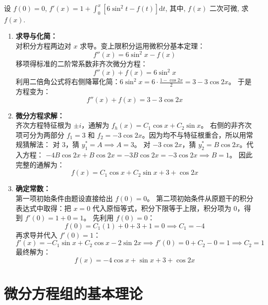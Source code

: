 \documentclass[lang=cn,11pt]{elegantbook}
\begin{document}
\begin{exercise}[积分微分方程转化为常系数方程]
设 $f(0)=0$, $f'(x)=1+\int_0^x[6\sin^2 t-f(t)]\mathrm{d}t$, 其中, $f(x)$ 二次可微, 求 $f(x)$.
\end{exercise}
\begin{solution}
\begin{enumerate}
    \item \textbf{求导与化简：}\\
    对积分方程两边对 $x$ 求导。变上限积分运用微积分基本定理：
    \[
    f''(x) = 6\sin^2 x - f(x)
    \]
    移项得标准的二阶常系数非齐次微分方程：
    \[
    f''(x) + f(x) = 6\sin^2 x
    \]
    利用二倍角公式将右侧降幂化简：$6\sin^2 x = 6 \cdot \frac{1-\cos 2x}{2} = 3 - 3\cos 2x$。
    于是方程变为：
    \[
    f''(x) + f(x) = 3 - 3\cos 2x
    \]

    \item \textbf{微分方程求解：}\\
    齐次方程特征根为 $\pm i$，通解为 $f_h(x) = C_1\cos x + C_2\sin x$。
    右侧的非齐次项可分为两部分 $f_1 = 3$ 和 $f_2 = -3\cos 2x$。因为均不与特征根重合，所以用常规猜解法：
    对 $3$，猜 $y_1^* = A \implies A = 3$。
    对 $-3\cos 2x$，猜 $y_2^* = B\cos 2x$。代入方程：
    $-4B\cos 2x + B\cos 2x = -3B\cos 2x = -3\cos 2x \implies B = 1$。
    因此完整的通解为：
    \[
    f(x) = C_1\cos x + C_2\sin x + 3 + \cos 2x
    \]

    \item \textbf{确定常数：}\\
    第一项初始条件由题设直接给出 $f(0) = 0$。
    第二项初始条件从原题干的积分表达式中取得：把 $x=0$ 代入原恒等式，积分下限等于上限，积分项为 0，得到 $f'(0) = 1 + 0 = 1$。
    先利用 $f(0) = 0$：
    \[
    f(0) = C_1(1) + 0 + 3 + 1 = 0 \implies C_1 = -4
    \]
    再求导并代入 $f'(0) = 1$：
    \[
    f'(x) = -C_1\sin x + C_2\cos x - 2\sin 2x \implies f'(0) = 0 + C_2 - 0 = 1 \implies C_2 = 1
    \]
    最终解为：
    \[
    \boxed{f(x) = -4\cos x + \sin x + 3 + \cos 2x}
    \]
\end{enumerate}
\end{solution}


\section{微分方程组的基本理论}
\end{document}
